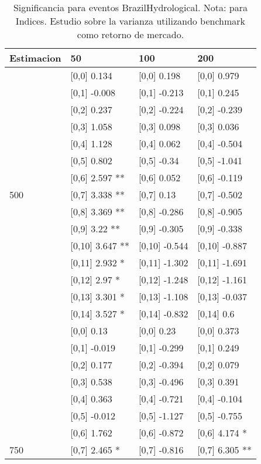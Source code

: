 \begin{table}

\caption{Significancia para eventos BrazilHydrological. Nota: para Indices. Estudio sobre la varianza utilizando benchmark como retorno de mercado.}
\centering
\begin{tabular}[t]{llll}
\toprule
Estimacion & 50 & 100 & 200\\
\midrule
 & {}[0,0] 0.134 & {}[0,0] 0.198 & {}[0,0] 0.979\\
 & {}[0,1] -0.008 & {}[0,1] -0.213 & {}[0,1] 0.245\\
 & {}[0,2] 0.237 & {}[0,2] -0.224 & {}[0,2] -0.239\\
 & {}[0,3] 1.058 & {}[0,3] 0.098 & {}[0,3] 0.036\\
 & {}[0,4] 1.128 & {}[0,4] 0.062 & {}[0,4] -0.504\\
\addlinespace
 & {}[0,5] 0.802 & {}[0,5] -0.34 & {}[0,5] -1.041\\
 & {}[0,6] 2.597 ** & {}[0,6] 0.052 & {}[0,6] -0.119\\
500 & {}[0,7] 3.338 ** & {}[0,7] 0.13 & {}[0,7] -0.502\\
 & {}[0,8] 3.369 ** & {}[0,8] -0.286 & {}[0,8] -0.905\\
 & {}[0,9] 3.22 ** & {}[0,9] -0.305 & {}[0,9] -0.338\\
\addlinespace
 & {}[0,10] 3.647 ** & {}[0,10] -0.544 & {}[0,10] -0.887\\
 & {}[0,11] 2.932 * & {}[0,11] -1.302 & {}[0,11] -1.691\\
 & {}[0,12] 2.97 * & {}[0,12] -1.248 & {}[0,12] -1.161\\
 & {}[0,13] 3.301 * & {}[0,13] -1.108 & {}[0,13] -0.037\\
 & {}[0,14] 3.527 * & {}[0,14] -0.832 & {}[0,14] 0.6\\
\addlinespace
 & {}[0,0] 0.13 & {}[0,0] 0.23 & {}[0,0] 0.373\\
 & {}[0,1] -0.019 & {}[0,1] -0.299 & {}[0,1] 0.249\\
 & {}[0,2] 0.177 & {}[0,2] -0.394 & {}[0,2] 0.079\\
 & {}[0,3] 0.538 & {}[0,3] -0.496 & {}[0,3] 0.391\\
 & {}[0,4] 0.363 & {}[0,4] -0.721 & {}[0,4] -0.104\\
\addlinespace
 & {}[0,5] -0.012 & {}[0,5] -1.127 & {}[0,5] -0.755\\
 & {}[0,6] 1.762 & {}[0,6] -0.872 & {}[0,6] 4.174 *\\
750 & {}[0,7] 2.465 * & {}[0,7] -0.816 & {}[0,7] 6.305 **\\

\end{tabular}
\end{table}
